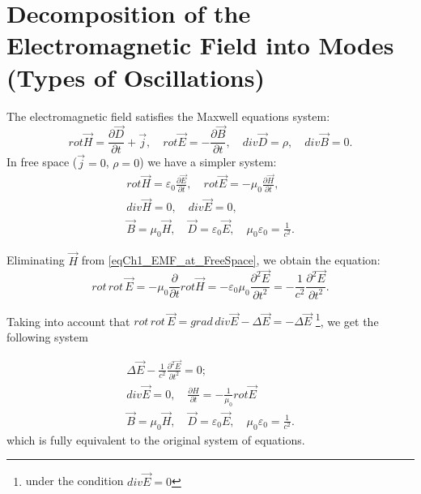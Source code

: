 \section{Decomposition of the Electromagnetic Field into Modes (Types of Oscillations)}
The electromagnetic field satisfies the Maxwell equations system:
\begin{equation}
rot \vec{H} = \frac{\partial \vec{D}}{\partial t} + \vec{j}, 
\quad
rot \vec{E} = - \frac{\partial \vec{B}}{\partial t}, 
\quad
div \vec{D} = \rho, \quad
div \vec{B} = 0.
\end{equation}
In free space ($\vec{j} = 0$, $\rho = 0$) we have a simpler system:
\begin{eqnarray}
rot \vec{H} = \varepsilon_0 \frac{\partial \vec{E}}{\partial t}, 
\quad
rot \vec{E} = - \mu_0 \frac{\partial \vec{H}}{\partial t}, 
\nonumber \\
div \vec{H} = 0,
\quad
div \vec{E} = 0, 
\nonumber \\
\vec{B} = \mu_0 \vec{H}, 
\quad 
\vec{D} = \varepsilon_0 \vec{E}, 
\quad
\mu_0 \varepsilon_0 = \frac{1}{c^2}.
\label{eqCh1_EMF_at_FreeSpace}
\end{eqnarray}

Eliminating $\vec{H}$ from \eqref{eqCh1_EMF_at_FreeSpace}, we obtain
the equation:
\begin{equation}
rot \, rot \, \vec{E} = - \mu_0 \frac{\partial}{\partial t} rot \vec{H} = -
\varepsilon_0 \mu_0 \frac{\partial^2 \vec{E}}{\partial t^2} = 
- \frac{1}{c^2} \frac{\partial^2 \vec{E}}{\partial t^2}.
\nonumber
\end{equation}

Taking into account that $rot \, rot \, \vec{E} = grad \, div \vec{E} - \Delta \vec{E} = - \Delta
\vec{E}$ \footnote{under the condition $div \vec E = 0$}, we get the following system

\begin{eqnarray}
\Delta \vec{E} - \frac{1}{c^2} \frac{\partial^2 \vec{E}}{\partial t^2}
= 0;
\nonumber \\
div \vec{E} = 0, 
\quad
\frac{\partial H}{\partial t} = - \frac{1}{\mu_0} rot \vec{E}
\nonumber \\
\vec{B} = \mu_0 \vec{H}, \quad \vec{D} = \varepsilon_0 \vec{E}, \quad \mu_0
\varepsilon_0 = \frac{1}{c^2}.
\label{eqCh1_EMF_at_FreeSpace2}
\end{eqnarray}
which is fully equivalent to the original system of equations.

